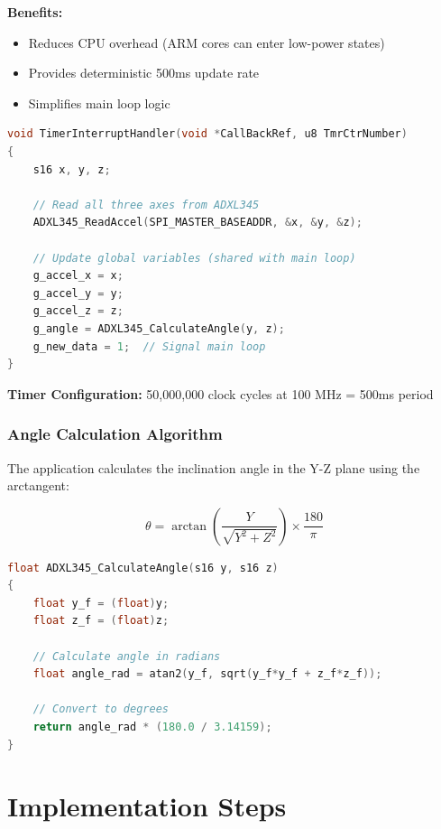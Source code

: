 \documentclass[11pt,a4paper]{article}
\begin{document}
\textbf{Benefits:}
\begin{itemize}
    \item Reduces CPU overhead (ARM cores can enter low-power states)
    \item Provides deterministic 500ms update rate
    \item Simplifies main loop logic
\end{itemize}

\begin{lstlisting}[language=C, caption=Timer Interrupt Service Routine]
void TimerInterruptHandler(void *CallBackRef, u8 TmrCtrNumber)
{
    s16 x, y, z;

    // Read all three axes from ADXL345
    ADXL345_ReadAccel(SPI_MASTER_BASEADDR, &x, &y, &z);

    // Update global variables (shared with main loop)
    g_accel_x = x;
    g_accel_y = y;
    g_accel_z = z;
    g_angle = ADXL345_CalculateAngle(y, z);
    g_new_data = 1;  // Signal main loop
}
\end{lstlisting}

\textbf{Timer Configuration:} 50,000,000 clock cycles at 100 MHz = 500ms period

\subsubsection{Angle Calculation Algorithm}

The application calculates the inclination angle in the Y-Z plane using the arctangent:

\begin{equation}
\theta = \arctan\left(\frac{Y}{\sqrt{Y^2 + Z^2}}\right) \times \frac{180}{\pi}
\end{equation}

\begin{lstlisting}[language=C, caption=Angle Calculation]
float ADXL345_CalculateAngle(s16 y, s16 z)
{
    float y_f = (float)y;
    float z_f = (float)z;

    // Calculate angle in radians
    float angle_rad = atan2(y_f, sqrt(y_f*y_f + z_f*z_f));

    // Convert to degrees
    return angle_rad * (180.0 / 3.14159);
}
\end{lstlisting}

\section{Implementation Steps}
\end{document}
